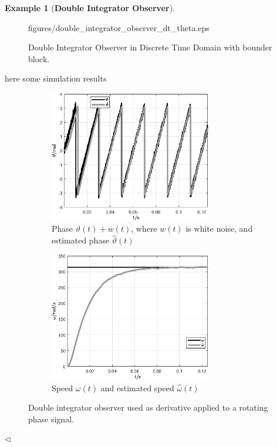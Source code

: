 \documentclass[11pt,a4paper,oneside]{book}
\numberwithin{equation}{section}
\theoremstyle{it}
\theoremstyle{definition}
\newtheorem{example}{Example}[chapter]
\begin{document}
\begin{example}[\textbf{Double Integrator Observer}]
\begin{figure}[H]
	{figures/double_integrator_observer_dt_theta.eps}
	\captionsetup{width=0.5\textwidth, font=small}		
	\caption{Double Integrator Observer in Discrete Time Domain with bounder 
	block.}
	\label{}
\end{figure}
\noindent here some simulation results
	\begin{figure}[H]
	\centering
	\begin{subfigure}{.5\textwidth}
		\centering
		\includegraphics[width = 200pt, 
		keepaspectratio]{figures/double_integrator/double_integrator_theta.eps}
		\captionsetup{width=0.75\textwidth}		
		\caption{Phase $\vartheta(t)+w(t)$, where $w(t)$ is white noise, and 
		estimated phase $\hat{\vartheta}(t)$}
		\label{}
	\end{subfigure}%
	\begin{subfigure}{.5\textwidth}
		\centering
		\includegraphics[width = 200pt, 
		keepaspectratio]{figures/double_integrator/double_integrator_omega.eps}
		\captionsetup{width=0.75\textwidth}		
		\caption{Speed $\omega(t)$ and estimated speed $\hat{\omega}(t)$}
		\label{}
	\end{subfigure}		
	\captionsetup{width=0.5\textwidth, font=small}		
	\caption{Double integrator observer used as derivative applied to a 
	rotating phase signal.}
	\label{}
\end{figure}

$\triangleleft$ 
\end{example}
\end{document}
